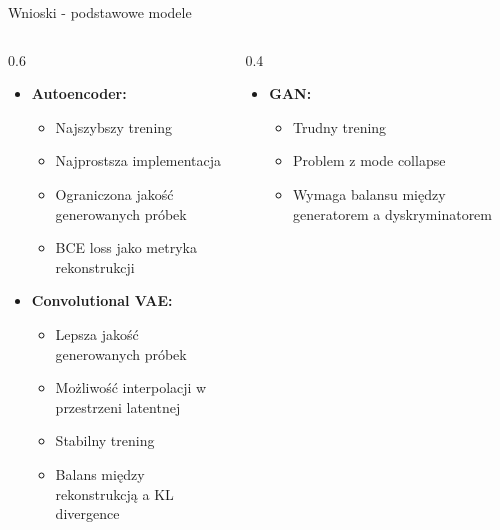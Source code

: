 \documentclass{beamer}
\begin{document}
\begin{frame}{Wnioski - podstawowe modele}
    \begin{columns}[T]
        \begin{column}{0.6\textwidth}
            \begin{itemize}
                \item \textbf{Autoencoder:}
                      \begin{itemize}
                          \item Najszybszy trening
                          \item Najprostsza implementacja
                          \item Ograniczona jakość generowanych próbek
                          \item BCE loss jako metryka rekonstrukcji
                      \end{itemize}
                \item \textbf{Convolutional VAE:}
                      \begin{itemize}
                          \item Lepsza jakość generowanych próbek
                          \item Możliwość interpolacji w przestrzeni latentnej
                          \item Stabilny trening
                          \item Balans między rekonstrukcją a KL divergence
                      \end{itemize}
            \end{itemize}
        \end{column}
        \begin{column}{0.4\textwidth}
            \begin{itemize}
                \item \textbf{GAN:}
                      \begin{itemize}
                          \item Trudny trening
                          \item Problem z mode collapse
                          \item Wymaga balansu między generatorem a dyskryminatorem
                      \end{itemize}
            \end{itemize}
        \end{column}
    \end{columns}
\end{frame}
\end{document}
